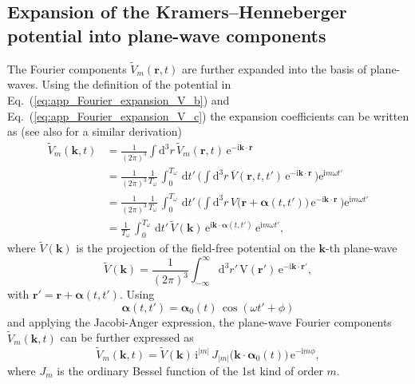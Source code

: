 \documentclass[
pra%
,preprint%
,amssymb, nobibnotes, aps, superscriptaddress, floatfix]{revtex4}
\renewcommand{\imath}{\mathrm{i}}
\newcommand{\dd}{\mathrm{d}}
\newcommand{\rv}{\mathbf{r}}
\newcommand{\av}{\boldsymbol{\alpha}}
\newcommand{\kv}{\mathbf{k}}
\newcommand{\phase}{\phi}
\newcommand{\Vt}{\widetilde{V}}
\newcommand{\Vb}{\overline{V}}
\newcommand{\KNORM}{\frac{1}{(2 \pi)^3}}
\newcommand{\Vidx}[1]{\Vt_{#1}}
\newcommand{\Vmk}{\Vidx{m}(\kv, t)} %
\newcommand{\Vk}{\Vt(\kv)} %
\def\e#1{\mathrm{e}^{#1}}
\begin{document}
%
%
%

\subsection{Expansion of the Kramers--Henneberger potential into plane-wave components}

The Fourier components $\Vidx{m}(\rv, t)$ are further expanded into the basis of plane-waves. Using the definition of the potential in Eq.~(\ref{eq:app_Fourier_expansion_V_b}) and Eq.~(\ref{eq:app_Fourier_expansion_V_c}) the expansion coefficients can be written as (see also \cite{Yao1992} for a similar derivation)
\begin{subequations}
	\begin{align}
	\Vmk &= \KNORM \int \dd^3 r \, \Vidx{m}(\rv, t) \, \e{-\imath \kv \cdot \rv} \\
	&= \KNORM \frac{1}{T_\omega} \, \int_0^{T_\omega} \, \dd t' \, 
	\Big(\int \dd^3 r \, \Vb(\rv, t, t') \, \e{-\imath \kv \cdot \rv} \,\Big)
	\e{\imath m \omega t'} \\
	&=\KNORM \frac{1}{T_\omega} \, \int_0^{T_\omega} \, \dd t' \, 
	\Big(\int \dd^3 r \, V\big(\rv +\av(t, t')\big) \, \e{-\imath \kv \cdot \rv} \,\Big)
	\e{\imath m \omega t'} \\
	&= \frac{1}{T_\omega} \, \int_0^{T_\omega} \, \dd t' \, 
	\Vk \, \e{\imath \kv \cdot \av(t, t')} \,
	\e{\imath m \omega t'},
	\end{align}
\end{subequations}
where $\Vk$ is the projection of the field-free potential on the $\kv$-th plane-wave
\begin{equation}
\Vk = \KNORM \int_{-\infty}^{\infty} \dd^3 r' \, \mathrm{V}(\rv') \, \e{-\imath \kv \cdot \rv'},
\end{equation}
with $\rv' = \rv + \av(t, t')$.
Using
\begin{equation}
\av(t, t') = \av_0(t) \, \cos(\omega t' + \phase)
\end{equation}
and 
applying the Jacobi-Anger expression, the plane-wave Fourier components $\Vmk$ can be further expressed as
\begin{equation}
\Vmk = \Vk \, \imath^{|m|} \, J_{|m|}\big( \kv \cdot \av_0(t)\big) \, \e{-\imath m \phase},\label{eq:app_Vmk_equation} 
\end{equation}
where $J_m$ is the ordinary Bessel function of the 1st kind of order $m$.
\end{document}
